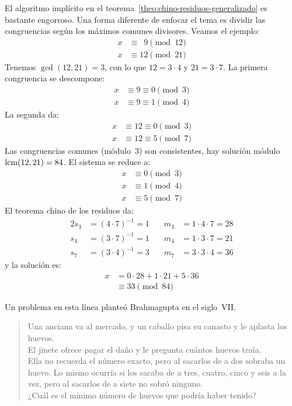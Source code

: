  El algoritmo implícito
  en el teorema~\ref{theo:chino-residuos-generalizado}
  es bastante engorroso.
  Una forma diferente de enfocar el tema es dividir las congruencias
  según los máximos comunes divisores.
  Veamos el ejemplo:
  \begin{align*}
    x &\equiv \phantom{0}9 \pmod{12} \\
    x &\equiv		12 \pmod{21}
  \end{align*}
  Tenemos \(\gcd(12, 21) = 3\),
  con lo que \(12 = 3 \cdot 4\) y \(21 = 3 \cdot 7\).
  La primera congruencia se descompone:
  \begin{align*}
    x &\equiv 9 \equiv 0 \pmod{3} \\
    x &\equiv 9 \equiv 1 \pmod{4}
  \end{align*}
  La segunda da:
  \begin{align*}
    x &\equiv 12 \equiv 0 \pmod{3} \\
    x &\equiv 12 \equiv 5 \pmod{7}
  \end{align*}
  Las congruencias comunes
  (módulo~\(3\)) son consistentes,
  hay solución módulo \(\operatorname{lcm}(12, 21) = 84\).
  El sistema se reduce a:
  \begin{align*}
    x &\equiv 0 \pmod{3} \\
    x &\equiv 1 \pmod{4} \\
    x &\equiv 5 \pmod{7}
  \end{align*}
  El teorema chino de los residuos da:%
  \begin{alignat*}{2}
    s_3 &= (4 \cdot 7)^{-1} = 1
	&\quad m_3 &= 1 \cdot 4 \cdot 7 = 28 \\
    s_4 &= (3 \cdot 7)^{-1} = 1
	&\quad m_4 &= 1 \cdot 3 \cdot 7 = 21 \\
    s_7 &= (3 \cdot 4)^{-1} = 3
	&\quad m_7 &= 3 \cdot 3 \cdot 4 = 36
  \end{alignat*}
  y la solución es:
  \begin{align*}
    x &= 0 \cdot 28 + 1 \cdot 21 + 5 \cdot 36 \\
      &\equiv 33 \pmod{84}
  \end{align*}

  Un problema en esta línea planteó Brahmagupta en el siglo~VII.%
  \begin{verse}
    Una anciana va al mercado,
    y un caballo pisa su canasto y le aplasta los huevos. \\
    \hspace{1em}El jinete ofrece pagar el daño
    y le pregunta cuántos huevos traía. \\
    \hspace{1em}Ella no recuerda el número exacto,
    pero al sacarlos de a dos sobraba un huevo.
    Lo mismo ocurría
    si los sacaba de a tres, cuatro, cinco y seis a la vez,
    pero al sacarlos de a siete no sobró ninguno. \\
    ¿Cuál es el mínimo número de huevos que podría haber tenido?
  \end{verse}

